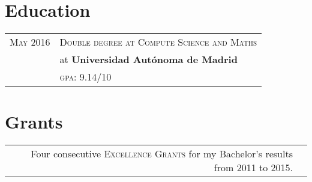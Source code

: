 \documentclass[a4paper,10pt]{article} %
\begin{document}

\section{Education}
\begin{tabular}{rl}

\textsc{May} 2016 & \textsc{Double degree at Compute Science and Maths}\\
& at \textbf{Universidad Autónoma de Madrid} \\
& \normalsize \textsc{gpa}: 9.14/10 \\
\end{tabular}


\section{Grants}

\begin{tabular}{rl}

Four consecutive \textsc{Excellence Grants} for my Bachelor's results from 2011 to 2015. \\

\end{tabular}

\end{document}
